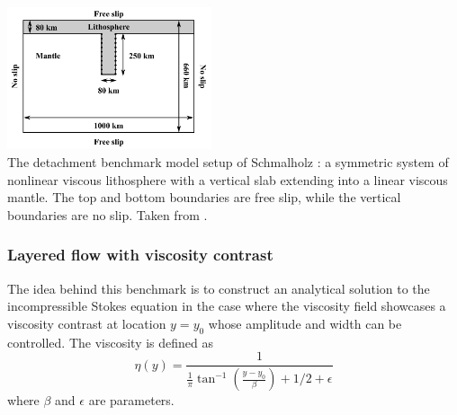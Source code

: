 \cite{schm11,aspectmanual,gltf18}

\begin{center}
\includegraphics[width=6cm]{images/benchmark_slabdetach/gltf18}\\
{\captionfont The detachment benchmark model setup of Schmalholz \cite{schm11}: 
a symmetric system of nonlinear viscous lithosphere with a vertical slab extending into a linear 
viscous mantle. The top and bottom boundaries are free slip, while the vertical boundaries are no slip.
Taken from \cite{gltf18}.}
\end{center}

\subsubsection{Layered flow with viscosity contrast} \label{sec:layfl}

The idea behind this benchmark is to construct an analytical solution to the incompressible
Stokes equation in the case where the viscosity field showcases a 
viscosity contrast at location $y=y_0$ whose amplitude and width can be controlled. 
The viscosity is defined as
\[
\eta(y)=\frac{1}{\frac{1}{\pi} \tan^{-1} (\frac{y-y_0}{\beta} ) + 1/2 + \epsilon}
\]
where $\beta$ and $\epsilon$ are parameters. 


